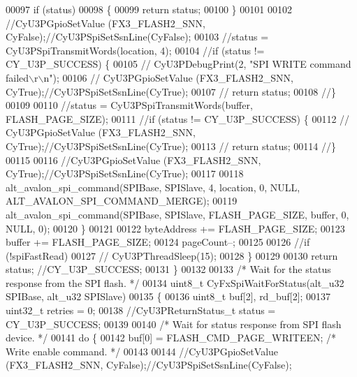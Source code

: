 \begin{DoxyCode}
00097             \textcolor{keywordflow}{if} (status)
00098             \{
00099                 \textcolor{keywordflow}{return} status;
00100             \}
00101 
00102             \textcolor{comment}{//CyU3PGpioSetValue (FX3\_FLASH2\_SNN, CyFalse);//CyU3PSpiSetSsnLine(CyFalse);}
00103             \textcolor{comment}{//status = CyU3PSpiTransmitWords(location, 4);}
00104             \textcolor{comment}{//if (status != CY\_U3P\_SUCCESS) \{}
00105             \textcolor{comment}{//    CyU3PDebugPrint(2, "SPI WRITE command failed\(\backslash\)r\(\backslash\)n");}
00106             \textcolor{comment}{//    CyU3PGpioSetValue (FX3\_FLASH2\_SNN, CyTrue);//CyU3PSpiSetSsnLine(CyTrue);}
00107             \textcolor{comment}{//    return status;}
00108             \textcolor{comment}{//\}}
00109 
00110             \textcolor{comment}{//status = CyU3PSpiTransmitWords(buffer, FLASH\_PAGE\_SIZE);}
00111             \textcolor{comment}{//if (status != CY\_U3P\_SUCCESS) \{}
00112             \textcolor{comment}{//  CyU3PGpioSetValue (FX3\_FLASH2\_SNN, CyTrue);//CyU3PSpiSetSsnLine(CyTrue);}
00113             \textcolor{comment}{//    return status;}
00114             \textcolor{comment}{//\}}
00115 
00116             \textcolor{comment}{//CyU3PGpioSetValue (FX3\_FLASH2\_SNN, CyTrue);//CyU3PSpiSetSsnLine(CyTrue);}
00117 
00118             alt_avalon_spi_command(SPIBase, SPISlave, 4, location, 0, NULL, 
      ALT_AVALON_SPI_COMMAND_MERGE);
00119             alt_avalon_spi_command(SPIBase, SPISlave, FLASH\_PAGE\_SIZE, buffer, 0, NULL, 0);
00120         \}
00121 
00122         byteAddress += FLASH_PAGE_SIZE;
00123         buffer += FLASH_PAGE_SIZE;
00124         pageCount--;
00125 
00126         \textcolor{comment}{//if (!spiFastRead)}
00127         \textcolor{comment}{//    CyU3PThreadSleep(15);}
00128     \}
00129 
00130     \textcolor{keywordflow}{return} status; \textcolor{comment}{//CY\_U3P\_SUCCESS;}
00131 \}
00132 
00133 \textcolor{comment}{/* Wait for the status response from the SPI flash. */}
00134 uint8\_t CyFxSpiWaitForStatus(alt_u32 SPIBase, alt_u32 SPISlave)
00135 \{
00136     uint8\_t buf[2], rd\_buf[2];
00137     uint32\_t retries = 0;
00138     \textcolor{comment}{//CyU3PReturnStatus\_t status = CY\_U3P\_SUCCESS;}
00139 
00140     \textcolor{comment}{/* Wait for status response from SPI flash device. */}
00141     \textcolor{keywordflow}{do} \{
00142         buf[0] = FLASH_CMD_PAGE_WRITEEN;  \textcolor{comment}{/* Write enable command. */}
00143 
00144         \textcolor{comment}{//CyU3PGpioSetValue (FX3\_FLASH2\_SNN, CyFalse);//CyU3PSpiSetSsnLine(CyFalse);}

\end{DoxyCode}
